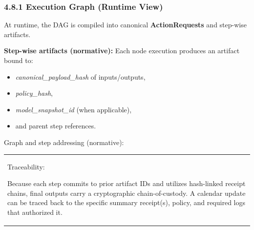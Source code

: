 \documentclass[
  11pt,
]{article}
\providecommand{\tightlist}{%
  \setlength{\itemsep}{0pt}\setlength{\parskip}{0pt}}
\begin{document}
\hypertarget{execution-graph-runtime-view}{%
\subsubsection{4.8.1 Execution Graph (Runtime
View)}\label{execution-graph-runtime-view}}

At runtime, the DAG is compiled into canonical \textbf{ActionRequests}
and step-wise artifacts.

\textbf{Step-wise artifacts (normative): }Each node execution produces
an artifact bound to:

\begin{itemize}
\tightlist
\item
  \emph{canonical\_payload\_hash} of inputs/outputs,
\item
  \emph{policy\_hash},
\item
  \emph{model\_snapshot\_id} (when applicable),
\item
  and parent step references.
\end{itemize}

Graph and step addressing (normative):


\begin{center}
\end{center}



\begin{center}
\end{center}


\begin{longtable}[]{@{}
  >{\raggedright\arraybackslash}p{}@{}}
\toprule\noalign{}
 \\
\midrule\noalign{}
\endhead
\bottomrule\noalign{}
\endlastfoot
Traceability:

Because each step commits to prior artifact IDs and utilizes hash-linked
receipt chains, final outputs carry a cryptographic chain-of-custody. A
calendar update can be traced back to the specific summary receipt(s),
policy, and required logs that authorized it. \\
\end{longtable}
\end{document}
